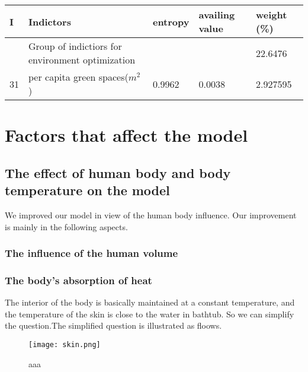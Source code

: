 \documentclass{mcmthesis}
\begin{document}
\begin{table}
\setlength{\abovecaptionskip}{0pt}
\setlength{\belowcaptionskip}{0pt}
\centering
\begin{tabular}{p{0.4cm}|p{8cm}|p{1.5cm}|p{1.5cm}|p{1.7cm}}
\hline
\bf I	& \bf Indictors			 &  \bf entropy		& \bf availing value		& \bf weight (\%) \\	
\hline
\rowcolor[gray]{0.9}	& Group of indictiors for environment optimization			& 		& 		& 22.6476 \\	
\hline
31		& per capita green spaces($m^2$)		& 0.9962		& 0.0038		& 2.927595 \\	
\hline
\hline
\end{tabular}
\end{table}




\section{Factors that affect the model}
\subsection{The effect of human body and body temperature on the model}
We improved our model in view of the human body influence. Our improvement is mainly in the following aspects.
\subsubsection{The influence of the human volume}%
\subsubsection{The body's absorption of heat}
The interior of the body is basically maintained at a constant temperature, and the temperature of the skin is close to the water in bathtub. So we can simplify the question.The simplified question is illustrated as floows.\\
\begin{figure}
\centerline{\texttt{[image: skin.png]}}
\caption{aaa}
\label{skin}
\end{figure}
\end{document}
